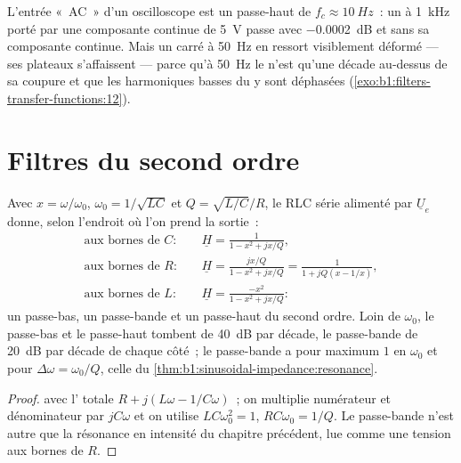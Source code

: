 \begin{example}\label{ex:b1:filters-transfer-functions:accoupling}
L'entrée «~AC~» d'un oscilloscope est un passe-haut de $f_c \approx \qty{10}{Hz}$~:
un  à \qty{1}{kHz} porté par une composante continue de \qty{5}{V}
passe avec \qty{-0.0002}{dB} et sans sa composante continue. Mais un
 carré à \qty{50}{Hz} en ressort visiblement déformé --- ses
plateaux s'affaissent --- parce qu'à \qty{50}{Hz} le  n'est
qu'une décade au-dessus de sa coupure et que les harmoniques basses du
 y sont déphasées
(\cref{exo:b1:filters-transfer-functions:12}).
\end{example}

\section{Filtres du second ordre}

\begin{proposition}\label{prop:b1:filters-transfer-functions:rlc}
Avec $x = \omega/\omega_0$, $\omega_0 = 1/\sqrt{LC}$ et $Q =
\sqrt{L/C}/R$, le RLC série alimenté par $\underline U_e$ donne, selon
l'endroit où l'on prend la sortie~:
\begin{align*}
\text{aux bornes de } C:&\quad \underline H = \frac{1}{1 - x^2 + jx/Q}, \\
\text{aux bornes de } R:&\quad \underline H = \frac{jx/Q}{1 - x^2 + jx/Q} = \frac{1}{1 + jQ(x - 1/x)}, \\
\text{aux bornes de } L:&\quad \underline H = \frac{-x^2}{1 - x^2 + jx/Q}:
\end{align*}
un passe-bas, un passe-bande et un passe-haut du second ordre. Loin de
$\omega_0$, le passe-bas et le passe-haut tombent de \qty{40}{dB} par
décade, le passe-bande de \qty{20}{dB} par décade de chaque côté~; le
passe-bande a pour maximum $1$ en $\omega_0$ et pour  $\Delta\omega =
\omega_0/Q$, celle du \cref{thm:b1:sinusoidal-impedance:resonance}.
\end{proposition}

\begin{proof}
 avec l' totale $R + j(L\omega - 1/C\omega)$~;
on multiplie numérateur et dénominateur par $jC\omega$ et on utilise
$LC\omega_0^2 = 1$, $RC\omega_0 = 1/Q$. Le passe-bande n'est autre que
la résonance en intensité du chapitre précédent, lue comme une tension
aux bornes de $R$.
\end{proof}

